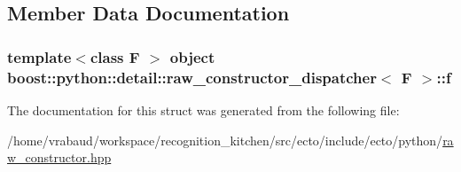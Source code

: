 \subsection{Member Data Documentation}
\hypertarget{structboost_1_1python_1_1detail_1_1raw__constructor__dispatcher_a055de51d7e8492c050508aa131ec1dd5}{
\subsubsection[{f}]{\setlength{\rightskip}{0pt plus 5cm}template$<$class F $>$ object {\bf boost\-::python\-::detail\-::raw\-\_\-constructor\-\_\-dispatcher}$<$ F $>$\-::f\hspace{0.3cm}{\ttfamily [private]}}}\label{structboost_1_1python_1_1detail_1_1raw__constructor__dispatcher_a055de51d7e8492c050508aa131ec1dd5}


The documentation for this struct was generated from the following file\-:\begin{DoxyCompactItemize}
\item 
/home/vrabaud/workspace/recognition\-\_\-kitchen/src/ecto/include/ecto/python/\hyperlink{raw__constructor_8hpp}{raw\-\_\-constructor.\-hpp}\end{DoxyCompactItemize}
